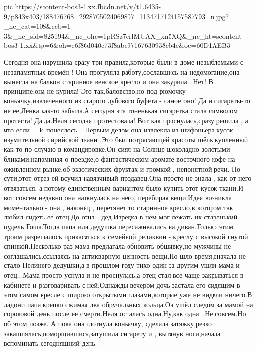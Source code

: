 \ifcmt
  pic https://scontent-bos3-1.xx.fbcdn.net/v/t1.6435-9/p843x403/188476768_2928705024069807_1134717124157587793_n.jpg?_nc_cat=108&ccb=1-3&_nc_sid=825194&_nc_ohc=1pRSz7erlMUAX_xn5XQ&_nc_ht=scontent-bos3-1.xx&tp=6&oh=e6f86d040c73f8abc97167630938cb4e&oe=60D1AEB3
\fi


Сегодня она нарушила сразу три правила,которые были в доме незыблемыми с незапамятных времён ! Она прогуляла работу,сославшись на недомогание,она вынесла на балкон старинное венское кресло и она закурила...Нет! В принципе,она не курила! Это так,баловство,но под рюмочку коньячку,извлеченного из старого дубового буфета - самое оно! Да и сигареты-то не ее,Ленка как-то забыла.А сегодня эта тоненькая сигаретка стала символом протеста! 
Да,да.Неля сегодня протестовала! Вот как проснулась,сразу решила , а что если.....И понеслось...
Первым делом она извлекла из шифоньера кусок изумительной сирийской ткани .Это был потрясающей красоты шёлк,купленный как-то по случаю в командировке.Он сиял на Солнце шоколадно-золотыми бликами,напоминая о поездке,о фантастическом аромате восточного кофе на оживленном рынке,об экзотических фруктах и громкой , непонятной речи. По сути,этот отрез ей всучил навязчивый продавец.Она просто не знала , как от него отвязаться, а потому единственным вариантом было купить этот кусок ткани.И вот совсем недавно она наткнулась на него, перебирая вещи.Идея возникла моментально - она , наконец , перетянет то старинное кресло,в котором так любил сидеть ее отец.До отца - дед.Изредка в нем мог лежать их старенький пудель Гоша.Тогда папа или дедушка пересаживались на диван.Только этим троим разрешалось прикасаться к семейной реликвии - креслу с высокой гнутой спинкой.Несколько раз мама предлагала обновить обшивку,но мужчины не соглашались,ссылаясь на антикварную ценность вещи.Но шло время,сначала не стало Нелиного дедушки,а в прошлом году тихо один за другим ушли мама и отец...Мама просто уснула и не проснулась,а отец стал все чаще закрываться в кабинете и разговаривать с ней.Однажды вечером дочь застала его сидящим в этом самом кресле с широко открытыми глазами,которые уже не видели ничего.В ладони папа крепко сжимал два обручальных кольца.Он ушёл следом за мамой на сороковой день после ее смерти.Неля осталась одна.Ну,как одна...Не совсем.Но об этом позже.
А пока она глотнула коньячку, сделала затяжку,резко закашлялась,поморщившись,затушила сигарету и , вытянув ноги,начала вспоминать сегодняшний день.
